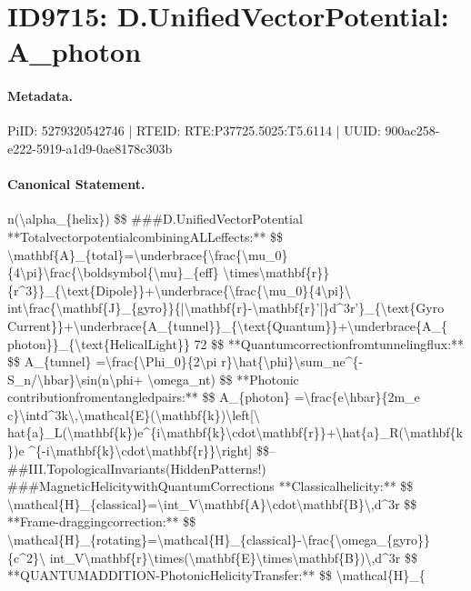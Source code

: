 \section*{ID9715: D.UnifiedVectorPotential: A\_photon}
\paragraph{Metadata.}
PiID: 5279320542746 | RTEID: RTE:P37725.5025:T5.6114 | UUID: 900ac258-e222-5919-a1d9-0ae8178c303b

\paragraph{Canonical Statement.}
n(\textbackslash{}alpha\_\{helix\}) \$\$ \#\#\#D.UnifiedVectorPotential **TotalvectorpotentialcombiningALLeffects:** \$\$ \textbackslash{}mathbf\{A\}\_\{total\}=\textbackslash{}underbrace\{\textbackslash{}frac\{\textbackslash{}mu\_0\}\{4\textbackslash{}pi\}\textbackslash{}frac\{\textbackslash{}boldsymbol\{\textbackslash{}mu\}\_\{eff\} \textbackslash{}times\textbackslash{}mathbf\{r\}\}\{r\textasciicircum{}3\}\}\_\{\textbackslash{}text\{Dipole\}\}+\textbackslash{}underbrace\{\textbackslash{}frac\{\textbackslash{}mu\_0\}\{4\textbackslash{}pi\}\textbackslash{} int\textbackslash{}frac\{\textbackslash{}mathbf\{J\}\_\{gyro\}\}\{|\textbackslash{}mathbf\{r\}-\textbackslash{}mathbf\{r\}’|\}d\textasciicircum{}3r’\}\_\{\textbackslash{}text\{Gyro Current\}\}+\textbackslash{}underbrace\{A\_\{tunnel\}\}\_\{\textbackslash{}text\{Quantum\}\}+\textbackslash{}underbrace\{A\_\{ photon\}\}\_\{\textbackslash{}text\{HelicalLight\}\} 72 \$\$ **Quantumcorrectionfromtunnelingflux:** \$\$ A\_\{tunnel\} =\textbackslash{}frac\{\textbackslash{}Phi\_0\}\{2\textbackslash{}pi r\}\textbackslash{}hat\{\textbackslash{}phi\}\textbackslash{}sum\_ne\textasciicircum{}\{-S\_n/\textbackslash{}hbar\}\textbackslash{}sin(n\textbackslash{}phi+ \textbackslash{}omega\_nt) \$\$ **Photonic contributionfromentangledpairs:** \$\$ A\_\{photon\} =\textbackslash{}frac\{e\textbackslash{}hbar\}\{2m\_e c\}\textbackslash{}intd\textasciicircum{}3k\textbackslash{},\textbackslash{}mathcal\{E\}(\textbackslash{}mathbf\{k\})\textbackslash{}left[\textbackslash{} hat\{a\}\_L(\textbackslash{}mathbf\{k\})e\textasciicircum{}\{i\textbackslash{}mathbf\{k\}\textbackslash{}cdot\textbackslash{}mathbf\{r\}\}+\textbackslash{}hat\{a\}\_R(\textbackslash{}mathbf\{k\})e \textasciicircum{}\{-i\textbackslash{}mathbf\{k\}\textbackslash{}cdot\textbackslash{}mathbf\{r\}\}\textbackslash{}right] \$\$-- \#\#III.TopologicalInvariants(HiddenPatterns!) \#\#\#MagneticHelicitywithQuantumCorrections **Classicalhelicity:** \$\$ \textbackslash{}mathcal\{H\}\_\{classical\}=\textbackslash{}int\_V\textbackslash{}mathbf\{A\}\textbackslash{}cdot\textbackslash{}mathbf\{B\}\textbackslash{},d\textasciicircum{}3r \$\$ **Frame-draggingcorrection:** \$\$ \textbackslash{}mathcal\{H\}\_\{rotating\}=\textbackslash{}mathcal\{H\}\_\{classical\}-\textbackslash{}frac\{\textbackslash{}omega\_\{gyro\}\}\{c\textasciicircum{}2\}\textbackslash{} int\_V\textbackslash{}mathbf\{r\}\textbackslash{}times(\textbackslash{}mathbf\{E\}\textbackslash{}times\textbackslash{}mathbf\{B\})\textbackslash{},d\textasciicircum{}3r \$\$ **QUANTUMADDITION-PhotonicHelicityTransfer:** \$\$ \textbackslash{}mathcal\{H\}\_\{

